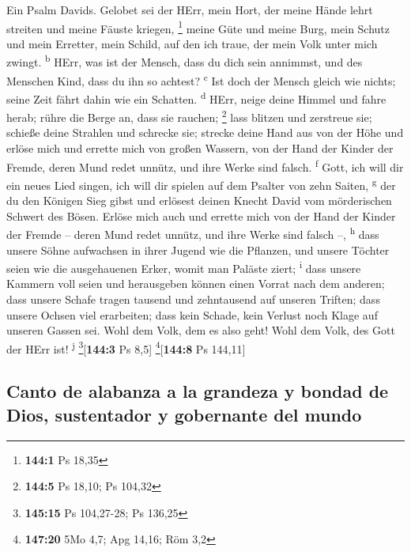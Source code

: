  Ein Psalm Davids. Gelobet sei der HErr, mein Hort, der
meine Hände lehrt streiten und meine Fäuste kriegen, \footnote{\textbf{144:1}
  Ps 18,35}  meine Güte und meine Burg, mein Schutz und
mein Erretter, mein Schild, auf den ich traue, der mein Volk unter mich
zwingt. \textsuperscript{b}  HErr, was ist der Mensch,
dass du dich sein annimmst, und des Menschen Kind, dass du ihn so
achtest? \textsuperscript{c}  Ist doch der Mensch gleich
wie nichts; seine Zeit fährt dahin wie ein Schatten. \textsuperscript{d}
 HErr, neige deine Himmel und fahre herab; rühre die Berge
an, dass sie rauchen; \footnote{\textbf{144:5} Ps 18,10; Ps 104,32}
 lass blitzen und zerstreue sie; schieße deine Strahlen
und schrecke sie;  strecke deine Hand aus von der Höhe und
erlöse mich und errette mich von großen Wassern, von der Hand der Kinder
der Fremde,  deren Mund redet unnütz, und ihre Werke sind
falsch. \textsuperscript{f}  Gott, ich will dir ein neues
Lied singen, ich will dir spielen auf dem Psalter von zehn Saiten,
\textsuperscript{g}  der du den Königen Sieg gibst und
erlösest deinen Knecht David vom mörderischen Schwert des Bösen.
 Erlöse mich auch und errette mich von der Hand der
Kinder der Fremde -- deren Mund redet unnütz, und ihre Werke sind falsch
--, \textsuperscript{h}  dass unsere Söhne aufwachsen in
ihrer Jugend wie die Pflanzen, und unsere Töchter seien wie die
ausgehauenen Erker, womit man Paläste ziert; \textsuperscript{i}
 dass unsere Kammern voll seien und herausgeben können
einen Vorrat nach dem anderen; dass unsere Schafe tragen tausend und
zehntausend auf unseren Triften;  dass unsere Ochsen viel
erarbeiten; dass kein Schade, kein Verlust noch Klage auf unseren Gassen
sei.  Wohl dem Volk, dem es also geht! Wohl dem Volk, des
Gott der HErr ist! \textsuperscript{j} \footnote{\textbf{145:15} Ps
  104,27-28; Ps 136,25}{[}\textbf{144:3} Ps 8,5{]}
\footnote{\textbf{147:20} 5Mo 4,7; Apg 14,16; Röm 3,2}{[}\textbf{144:8}
Ps 144,11{]}

\hypertarget{canto-de-alabanza-a-la-grandeza-y-bondad-de-dios-sustentador-y-gobernante-del-mundo}{%
\subsection{Canto de alabanza a la grandeza y bondad de Dios,
sustentador y gobernante del
mundo}\label{canto-de-alabanza-a-la-grandeza-y-bondad-de-dios-sustentador-y-gobernante-del-mundo}}

